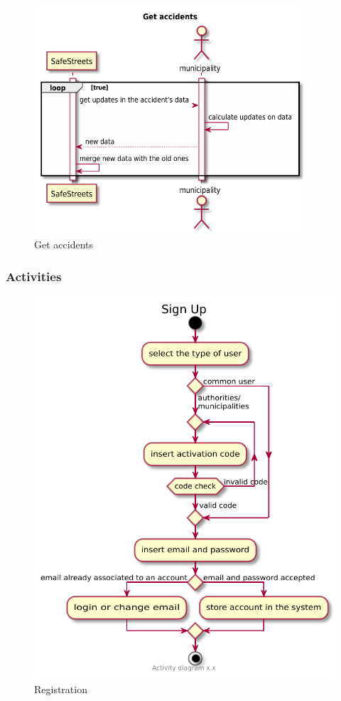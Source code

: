 \documentclass[a4paper]{article}
\begin{document}
\begin{figure}[H]
\centering
\includegraphics[width=0.9\textwidth]{get_accidents_sequence_diagram}
\caption{Get accidents}
\end{figure}

\subsubsection{Activities}

\begin{figure}[H]
\centering
\includegraphics[width=\textwidth]{activity_diagram_login}
\caption{Registration}
\end{figure}
\end{document}
